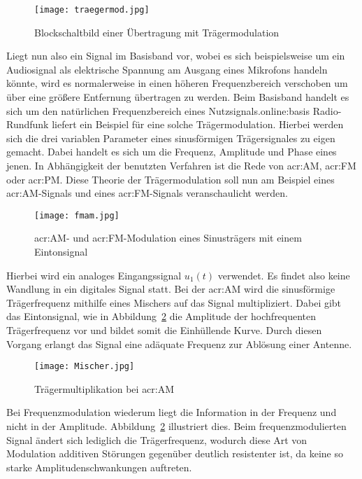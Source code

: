 \begin{figure}[H]
	\centering
	\texttt{[image: traegermod.jpg]}
	\caption[Blockschaltbild einer Übertragung mit Trägermodulation]{Blockschaltbild einer Übertragung mit Trägermodulation} 
	\cite{NT}
	\label{fig:traeger}
\end{figure}
Liegt nun also ein Signal im Basisband vor, wobei es sich beispielsweise um ein Audiosignal als elektrische Spannung am Ausgang eines Mikrofons handeln könnte, wird es normalerweise in einen höheren Frequenzbereich verschoben um über eine größere Entfernung übertragen zu werden. Beim Basisband handelt es sich um den natürlichen Frequenzbereich eines Nutzsignals.\gls{online:basis} Radio-Rundfunk liefert ein Beispiel für eine solche Trägermodulation. Hierbei werden sich die drei variablen Parameter eines sinusförmigen Trägersignales zu eigen gemacht. Dabei handelt es sich um die Frequenz, Amplitude und Phase eines jenen. In Abhängigkeit der benutzten Verfahren ist die Rede von \gls{acr:AM}, \gls{acr:FM} oder \gls{acr:PM}.\cite{NT} Diese Theorie der Trägermodulation soll nun am Beispiel eines \gls{acr:AM}-Signals und eines \gls{acr:FM}-Signals veranschaulicht werden. 

\begin{figure}[H]
	\centering
	\texttt{[image: fmam.jpg]}
	\caption[\gls{acr:AM}- und \gls{acr:FM}-Modulation eines Sinusträgers mit einem Eintonsignal]{\gls{acr:AM}- und \gls{acr:FM}-Modulation eines Sinusträgers mit einem Eintonsignal} 
	\cite{NT}
	\label{fig:fmam}
\end{figure}

Hierbei wird ein analoges Eingangssignal $u_1(t)$ verwendet. Es findet also keine Wandlung in ein digitales Signal statt. Bei der \gls{acr:AM} wird die sinusförmige Trägerfrequenz mithilfe eines Mischers auf das Signal multipliziert. Dabei gibt das Eintonsignal, wie in Abbildung~\ref{fig:fmam} die Amplitude der hochfrequenten Trägerfrequenz vor und bildet somit die Einhüllende Kurve. Durch diesen Vorgang erlangt das Signal eine adäquate Frequenz zur Ablösung einer Antenne.\cite{klostermeyerDigitaleModulation2001}\cite{hftech}

\begin{figure}[H]
	\centering
	\texttt{[image: Mischer.jpg]}
	\caption[Trägermultiplikation bei \gls{acr:AM}]{Trägermultiplikation bei \gls{acr:AM}} 
	\cite{NT}
	\label{fig:mischer}
\end{figure}

Bei Frequenzmodulation wiederum liegt die Information in der Frequenz und nicht in der Amplitude. Abbildung~\ref{fig:fmam} illustriert dies. Beim frequenzmodulierten Signal ändert sich lediglich die Trägerfrequenz, wodurch diese Art von Modulation additiven Störungen gegenüber deutlich resistenter ist, da keine so starke Amplitudenschwankungen auftreten.\cite{hoeher}


